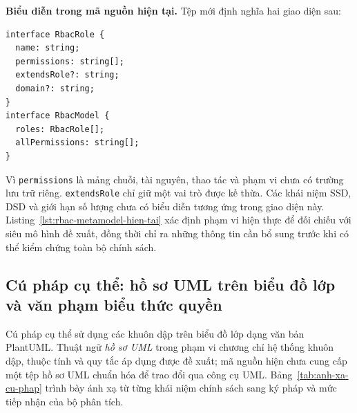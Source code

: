 \textbf{Biểu diễn trong mã nguồn hiện tại.} Tệp  mới định nghĩa hai giao diện sau:

\begin{lstlisting}[caption={Phần RBAC của siêu mô hình đã cài đặt},label={lst:rbac-metamodel-hien-tai}]
interface RbacRole {
  name: string;
  permissions: string[];
  extendsRole?: string;
  domain?: string;
}
interface RbacModel {
  roles: RbacRole[];
  allPermissions: string[];
}
\end{lstlisting}

Vì \texttt{permissions} là mảng chuỗi, tài nguyên, thao tác và phạm vi chưa có trường lưu trữ riêng. \texttt{extendsRole} chỉ giữ một vai trò được kế thừa. Các khái niệm SSD, DSD và giới hạn số lượng chưa có biểu diễn tương ứng trong giao diện này. Listing~\ref{lst:rbac-metamodel-hien-tai} xác định phạm vi hiện thực để đối chiếu với siêu mô hình đề xuất, đồng thời chỉ ra những thông tin cần bổ sung trước khi có thể kiểm chứng toàn bộ chính sách.

\subsection{Cú pháp cụ thể: hồ sơ UML trên biểu đồ lớp và văn phạm biểu thức quyền}
\label{subsec:cu-phap-cu-the}

Cú pháp cụ thể sử dụng các khuôn dập trên biểu đồ lớp dạng văn bản PlantUML. Thuật ngữ \emph{hồ sơ UML} trong phạm vi chương chỉ hệ thống khuôn dập, thuộc tính và quy tắc áp dụng được đề xuất; mã nguồn hiện chưa cung cấp một tệp hồ sơ UML chuẩn hóa để trao đổi qua công cụ UML. Bảng~\ref{tab:anh-xa-cu-phap} trình bày ánh xạ từ từng khái niệm chính sách sang ký pháp và mức tiếp nhận của bộ phân tích.

